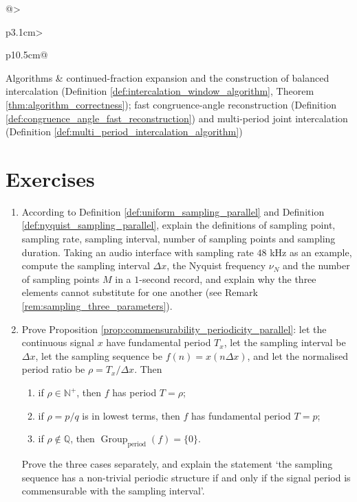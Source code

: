 \begin{center}
\begin{tabular}{@{}>{\raggedright\arraybackslash\hspace{0pt}}p{3.1cm}>
                {\raggedright\arraybackslash\hspace{0pt}}p{10.5cm}@{}}
Algorithms & continued-fraction expansion and the construction of balanced intercalation (Definition \ref{def:intercalation_window_algorithm}, Theorem \ref{thm:algorithm_correctness}); fast congruence-angle reconstruction (Definition \ref{def:congruence_angle_fast_reconstruction}) and multi-period joint intercalation (Definition \ref{def:multi_period_intercalation_algorithm}) \\
\bottomrule
\end{tabular}
\end{center}

\section*{Exercises}

\begin{enumerate}[leftmargin=3em, label=\textbf{Exercise \arabic*}]
    \item According to Definition \ref{def:uniform_sampling_parallel} and Definition \ref{def:nyquist_sampling_parallel},
    explain the definitions of sampling point, sampling rate, sampling interval, number of sampling points and sampling duration.
    Taking an audio interface with sampling rate $48$ kHz as an example,
    compute the sampling interval $\Delta x$, the Nyquist frequency $\nu_N$ and the number of sampling points $M$ in a $1$-second record,
    and explain why the three elements cannot substitute for one another (see Remark \ref{rem:sampling_three_parameters}).

    \item Prove Proposition \ref{prop:commensurability_periodicity_parallel}:
    let the continuous signal $x$ have fundamental period $T_x$, let the sampling interval be $\Delta x$,
    let the sampling sequence be $f(n)=x(n\Delta x)$, and let the normalised period ratio be $\rho=T_x/\Delta x$. Then
    \begin{enumerate}[label=(\roman*)]
        \item if $\rho\in\mathbb{N}^+$, then $f$ has period $T=\rho$;
        \item if $\rho=p/q$ is in lowest terms, then $f$ has fundamental period $T=p$;
        \item if $\rho\notin\mathbb{Q}$, then $\operatorname{Group}_{\mathrm{period}}(f)=\{0\}$.
    \end{enumerate}
    Prove the three cases separately, and explain the statement `the sampling sequence has a non-trivial periodic structure if and only if the signal period is commensurable with the sampling interval'.


\end{enumerate}
